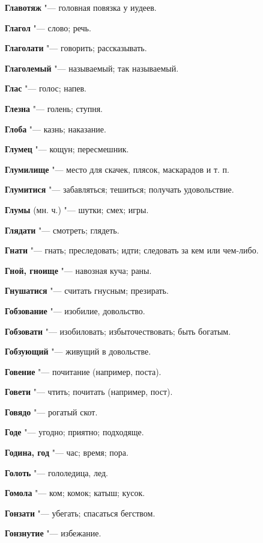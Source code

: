 \begin{mymulticols}
\noindent\textbf{Главотяж} "--- головная повязка у иудеев. 

\noindent\textbf{Глагол} "--- слово; речь. 

\noindent\textbf{Глаголати} "--- говорить; рассказывать. 

\noindent\textbf{Глаголемый} "--- называемый; так называемый. 

\noindent\textbf{Глас} "--- голос; напев. 

\noindent\textbf{Глезна} "--- голень; ступня. 

\noindent\textbf{Глоба} "--- казнь; наказание. 

\noindent\textbf{Глумец} "--- кощун; пересмешник. 

\noindent\textbf{Глумилище} "--- место для скачек, плясок, маскарадов и т. п. 

\noindent\textbf{Глумитися} "--- забавляться; тешиться; получать удовольствие. 

\noindent\textbf{Глумы} (мн. ч.) "--- шутки; смех; игры. 

\noindent\textbf{Глядати} "--- смотреть; глядеть. 

\noindent\textbf{Гнати} "--- гнать; преследовать; идти; следовать за кем или чем-либо. 

\noindent\textbf{Гной, гноище} "--- навозная куча; раны. 

\noindent\textbf{Гнушатися} "--- считать гнусным; презирать. 

\noindent\textbf{Гобзование} "--- изобилие, довольство. 

\noindent\textbf{Гобзовати} "--- изобиловать; избыточествовать; быть богатым. 

\noindent\textbf{Гобзующий} "--- живущий в довольстве. 

\noindent\textbf{Говение} "--- почитание (например, поста). 

\noindent\textbf{Говети} "--- чтить; почитать (например, пост). 

\noindent\textbf{Говядо} "--- рогатый скот. 

\noindent\textbf{Годе} "--- угодно; приятно; подходяще. 

\noindent\textbf{Година, год} "--- час; время; пора. 

\noindent\textbf{Голоть} "--- гололедица, лед. 

\noindent\textbf{Гомола} "--- ком; комок; катыш; кусок. 

\noindent\textbf{Гонзати} "--- убегать; спасаться бегством. 

\noindent\textbf{Гонзнутие} "--- избежание. 


\end{mymulticols}
